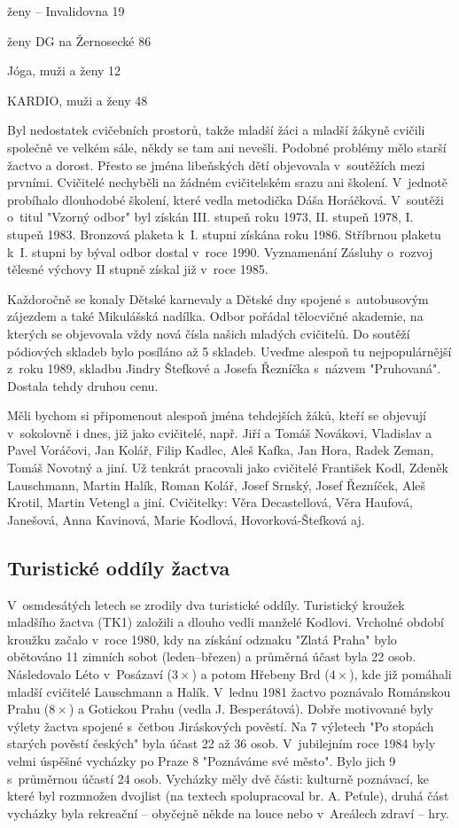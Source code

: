 \documentclass[a5paper, 11pt, twoside]{article}
\begin{document}
ženy -- Invalidovna 19

ženy DG na Žernosecké 86

Jóga, muži a ženy 12

KARDIO, muži a ženy 48

\vspace*{6pt}

\noindent
Byl nedostatek cvičebních prostorů, takže mladší žáci a mladší žákyně
cvičili společně ve velkém sále, někdy se tam ani nevešli. Podobné
problémy mělo starší žactvo a dorost. Přesto se jména libeňských dětí
objevovala v~soutěžích mezi prvními. Cvičitelé nechyběli na žádném
cvičitelském srazu ani školení. V~jednotě probíhalo dlouhodobé školení,
které vedla metodička Dáša Horáčková. V~soutěži o~titul "Vzorný odbor"
byl získán III. stupeň roku 1973, II. stupeň 1978, I. stupeň 1983.
Bronzová plaketa k~I. stupni získána roku 1986. Stříbrnou plaketu k~I.
stupni by býval odbor dostal v~roce 1990. Vyznamenání Zásluhy o~rozvoj
tělesné výchovy II stupně získal již v~roce 1985.

Každoročně se konaly Dětské karnevaly a Dětské dny spojené s~autobusovým
zájezdem a také Mikulášská nadílka. Odbor pořádal tělocvičné akademie,
na kterých se objevovala vždy nová čísla našich mladých cvičitelů. Do
soutěží pódiových skladeb bylo posíláno až 5 skladeb. Uveďme alespoň tu
nejpopulárnější z~roku 1989, skladbu Jindry Štefkové a Josefa Řezníčka
s~názvem "Pruhovaná". Dostala tehdy druhou cenu.

Měli bychom si připomenout alespoň jména tehdejších žáků, kteří se
objevují v~sokolovně i dnes, již jako cvičitelé, např. Jiří a Tomáš
Novákovi, Vladislav a Pavel Voráčovi, Jan Kolář, Filip Kadlec, Aleš
Kafka, Jan Hora, Radek Zeman, Tomáš Novotný a jiní. Už tenkrát pracovali
jako cvičitelé František Kodl, Zdeněk Lauschmann, Martin Halík, Roman
Kolář, Josef Srnský, Josef Řezníček, Aleš Krotil, Martin Vetengl a jiní.
Cvičitelky: Věra Decastellová, Věra Haufová, Janešová, Anna Kavinová,
Marie Kodlová, Hovorková-Štefková aj.

\subsection{Turistické oddíly
žactva}

V~osmdesátých letech se zrodily dva turistické oddíly. Turistický
kroužek mladšího žactva (TK1) založili a dlouho vedli manželé Kodlovi.
Vrcholné období kroužku začalo v~roce 1980, kdy na získání odznaku
"Zlatá Praha" bylo obětováno 11 zimních sobot (leden--březen) a
průměrná účast byla 22 osob. Následovalo Léto v~Posázaví (\(3\times\)) a potom
Hřebeny Brd (\(4\times\)), kde již pomáhali mladší cvičitelé Lauschmann a Halík.
V~lednu 1981 žactvo poznávalo Románskou Prahu (\(8\times\)) a Gotickou Prahu
(vedla J. Besperátová). Dobře motivované byly výlety žactva spojené
s~četbou Jiráskových pověstí. Na 7 výletech "Po stopách starých pověstí
českých" byla účast 22 až 36 osob. V~jubilejním roce 1984 byly velmi
úspěšné vycházky po Praze 8 "Poznáváme své město". Bylo jich 9
s~průměrnou účastí 24 osob. Vycházky měly dvě části: kulturně poznávací,
ke které byl rozmnožen dvojlist (na textech spolupracoval br. A.
Peťule), druhá část vycházky byla rekreační -- obyčejně někde na louce
nebo v~Areálech zdraví -- hry.
\end{document}
